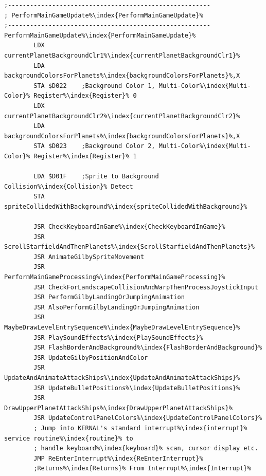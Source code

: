 \begin{lstlisting}[escapechar=\%,caption=\icode{PerformMainGameUpdate\index{PerformMainGameUpdate}}\, the spaghetti junction handling nearly everything
during main gameplay. We'll see more of this code section later in the book. During the entry level sequence\index{sequence}
it is \icode{MaybeDrawLevelEntrySequence\index{MaybeDrawLevelEntrySequence}} and \icode{PlaySoundEffects\index{PlaySoundEffects}} that do most of the work.]
;-------------------------------------------------------
; PerformMainGameUpdate%\index{PerformMainGameUpdate}%
;-------------------------------------------------------
PerformMainGameUpdate%\index{PerformMainGameUpdate}%
        LDX currentPlanetBackgroundClr1%\index{currentPlanetBackgroundClr1}%
        LDA backgroundColorsForPlanets%\index{backgroundColorsForPlanets}%,X
        STA $D022    ;Background Color 1, Multi-Color%\index{Multi-Color}% Register%\index{Register}% 0
        LDX currentPlanetBackgroundClr2%\index{currentPlanetBackgroundClr2}%
        LDA backgroundColorsForPlanets%\index{backgroundColorsForPlanets}%,X
        STA $D023    ;Background Color 2, Multi-Color%\index{Multi-Color}% Register%\index{Register}% 1

        LDA $D01F    ;Sprite to Background Collision%\index{Collision}% Detect
        STA spriteCollidedWithBackground%\index{spriteCollidedWithBackground}%

        JSR CheckKeyboardInGame%\index{CheckKeyboardInGame}%
        JSR ScrollStarfieldAndThenPlanets%\index{ScrollStarfieldAndThenPlanets}%
        JSR AnimateGilbySpriteMovement
        JSR PerformMainGameProcessing%\index{PerformMainGameProcessing}%
        JSR CheckForLandscapeCollisionAndWarpThenProcessJoystickInput
        JSR PerformGilbyLandingOrJumpingAnimation
        JSR AlsoPerformGilbyLandingOrJumpingAnimation
        JSR MaybeDrawLevelEntrySequence%\index{MaybeDrawLevelEntrySequence}%
        JSR PlaySoundEffects%\index{PlaySoundEffects}%
        JSR FlashBorderAndBackground%\index{FlashBorderAndBackground}%
        JSR UpdateGilbyPositionAndColor
        JSR UpdateAndAnimateAttackShips%\index{UpdateAndAnimateAttackShips}%
        JSR UpdateBulletPositions%\index{UpdateBulletPositions}%
        JSR DrawUpperPlanetAttackShips%\index{DrawUpperPlanetAttackShips}%
        JSR UpdateControlPanelColors%\index{UpdateControlPanelColors}%
        ; Jump into KERNAL's standard interrupt%\index{interrupt}% service routine%\index{routine}% to 
        ; handle keyboard%\index{keyboard}% scan, cursor display etc.
        JMP ReEnterInterrupt%\index{ReEnterInterrupt}% 
        ;Returns%\index{Returns}% From Interrupt%\index{Interrupt}%
\end{lstlisting}

